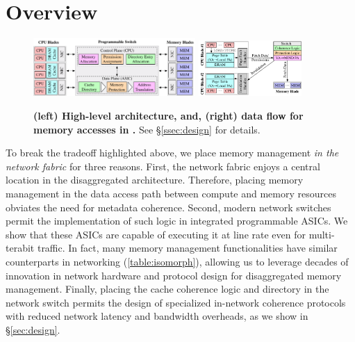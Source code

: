 \section{\mind Overview}
\label{sec:mindoverview}

\begin{figure}[!t]
\centering
\includegraphics[width=0.55\textwidth]{fig/mind/design}\hspace{3em}
\includegraphics[width=0.35\textwidth]{fig/mind/data_flow}%
\vspace{-0.5em}
\caption[High-level \mind architecture and data flow for memory accesses in \mind]{\textbf{(left) High-level \mind architecture, and, (right) data flow for memory accesses in \mind.} See \S\ref{ssec:design} for details.}
\label{fig:system_diagram}
\end{figure}

To break the tradeoff highlighted above, we place memory management \textit{in the network fabric} for three reasons.
First, the network fabric enjoys a central location in the disaggregated architecture. Therefore, placing memory management in the data access path between compute and memory resources obviates the need for metadata coherence. 
Second, modern network switches~\cite{progswitch1, progswitch2, progswitch3} permit the implementation of such logic in integrated programmable ASICs. We show that these ASICs are capable of executing it at line rate even for multi-terabit traffic. In fact, many memory management functionalities have similar counterparts in networking (\autoref{table:isomorph}), allowing us to leverage decades of innovation in network hardware and protocol design for disaggregated memory management.
Finally, placing the cache coherence logic and directory in the network switch permits the design of specialized in-network coherence protocols with reduced network latency and bandwidth overheads, as we show in \S\ref{sec:design}. 

